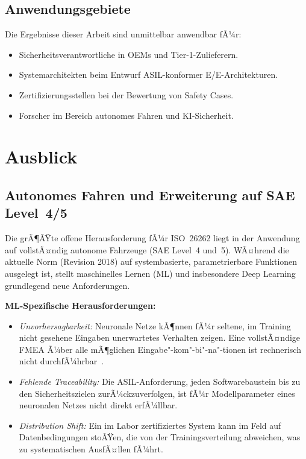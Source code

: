 ﻿\documentclass[a4paper,12pt]{article}
\theoremstyle{definition}
\begin{document}
\subsection{Anwendungsgebiete}

Die Ergebnisse dieser Arbeit sind unmittelbar anwendbar fÃ¼r:
\begin{itemize}
  \item Sicherheitsverantwortliche in OEMs und Tier-1-Zulieferern.
  \item Systemarchitekten beim Entwurf ASIL-konformer
        E/E-Architekturen.
  \item Zertifizierungsstellen bei der Bewertung von Safety Cases.
  \item Forscher im Bereich autonomes Fahren und KI-Sicherheit.
\end{itemize}

\section{Ausblick}

\subsection{Autonomes Fahren und Erweiterung auf SAE Level~4/5}

Die grÃ¶ÃŸte offene Herausforderung fÃ¼r ISO~26262 liegt in der Anwendung
auf vollstÃ¤ndig autonome Fahrzeuge (SAE Level~4 und~5). WÃ¤hrend die
aktuelle Norm (Revision 2018) auf systembasierte, parametrierbare
Funktionen ausgelegt ist, stellt maschinelles Lernen (ML) und
insbesondere Deep Learning grundlegend neue Anforderungen.

\textbf{ML-Spezifische Herausforderungen:}
\begin{itemize}
  \item \emph{Unvorhersagbarkeit:} Neuronale Netze kÃ¶nnen fÃ¼r seltene,
        im Training nicht gesehene Eingaben unerwartetes Verhalten
        zeigen. Eine vollstÃ¤ndige FMEA Ã¼ber alle mÃ¶glichen
        Eingabe"-kom"-bi"-na"-tionen ist rechnerisch nicht
        durchfÃ¼hrbar~\cite{burton_2020}.
  \item \emph{Fehlende Traceability:} Die ASIL-Anforderung, jeden
        Softwarebaustein bis zu den Sicherheitszielen zurÃ¼ckzuverfolgen,
        ist fÃ¼r Modellparameter eines neuronalen Netzes nicht direkt
        erfÃ¼llbar.
  \item \emph{Distribution Shift:} Ein im Labor zertifiziertes System
        kann im Feld auf Datenbedingungen stoÃŸen, die von der
        Trainingsverteilung abweichen, was zu systematischen
        AusfÃ¤llen fÃ¼hrt.
\end{itemize}
\end{document}
